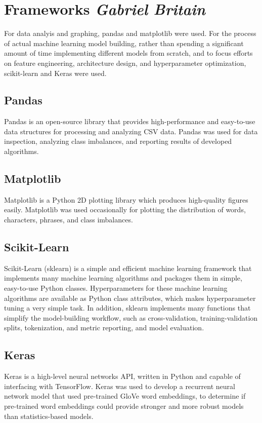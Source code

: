 \documentclass{article}
\begin{document}
\section{Frameworks \textit{Gabriel Britain}}{
  For data analyis and graphing, pandas\cite{mckinney-proc-scipy-2010}
  and matplotlib\cite{Hunter:2007} were used. For the process of actual
  machine learning model building, rather than spending a significant amount
  of time implementing different models from scratch, and to focus efforts on
  feature engineering, architecture design, and hyperparameter optimization,
  scikit-learn\cite{sklearn_api} and Keras\cite{chollet2015keras} were used.
  \subsection{Pandas}{
	  Pandas is an open-source library that provides high-performance and
	  easy-to-use data structures for processing and analyzing CSV data.
	  Pandas was used for data inspection, analyzing class imbalances, and
	  reporting results of developed algorithms.
  }
  \subsection{Matplotlib}{
	  Matplotlib is a Python 2D plotting library which produces high-quality
	  figures easily. Matplotlib was used occasionally for plotting the
	  distribution of words, characters, phrases, and class imbalances.
  }
  \subsection{Scikit-Learn}{
	  Scikit-Learn (sklearn) is a simple and efficient machine learning framework
	  that implements many machine learning algorithms and packages them in
	  simple, easy-to-use Python classes. Hyperparameters for these machine
	  learning algorithms are available as Python class attributes, which makes
	  hyperparameter tuning a very simple task. In addition, sklearn implements
	  many functions that simplify the model-building workflow, such as
	  cross-validation, training-validation splits, tokenization, and metric
	  reporting, and model evaluation.
  }
  \subsection{Keras}{
	  Keras is a high-level neural networks API, written in Python and capable of
	  interfacing with TensorFlow\cite{tensorflow2015-whitepaper}. Keras was used
	  to develop a recurrent neural network model that used pre-trained GloVe word
	  embeddings\cite{pennington2014glove}, to determine if pre-trained word
	  embeddings could provide stronger and more robust models than
	  statistics-based models.
  }
 }
\end{document}
